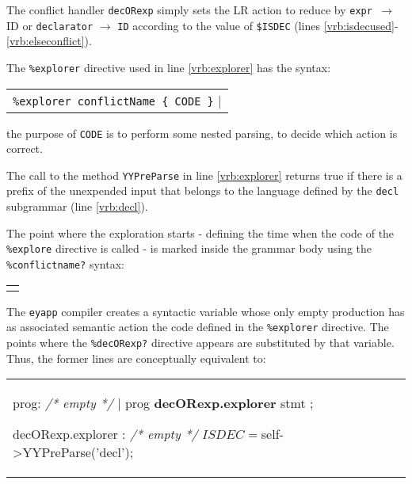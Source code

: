 The conflict handler \verb|decORexp| simply sets the LR action
to reduce by 
\mbox{\tt expr $\rightarrow$} \mbox{ID}
or
\verb|declarator| $\rightarrow$ \verb|ID|
according to the value of \verb|$ISDEC| (lines \ref{vrb:isdecused}-\ref{vrb:elseconflict}).


The \verb|%explorer| directive used in line \ref{vrb:explorer} has the syntax:
\begin{center}
\begin{tabular}{p{147.43pt}}
\verb|%explorer conflictName { CODE }| 
\end{tabular}
\end{center}
the purpose of \verb|CODE| is to perform some nested 
parsing, to decide which action is correct.

The call to the method \verb|YYPreParse| in 
line \ref{vrb:explorer}
returns true if there is a prefix of the unexpended input
that belongs to the language defined by the \verb|decl| subgrammar (line \ref{vrb:decl}).

The point where the exploration starts - defining the time when the code 
of the \verb|%explore| directive is called -
is marked inside
the grammar body using the \verb|%conflictname?| syntax:

\begin{center}
\begin{tabular}{p{5cm}}
\begin{VERBATIM}[firstnumber=26]
prog:
    \textit{/* empty */}
  | prog \textbf{%
;
\end{VERBATIM}
\end{tabular}
\end{center}

The \verb|eyapp| compiler 
creates a syntactic variable  
whose only empty production has as associated semantic action
the code defined in the \verb|%explorer| directive. The points where the 
\verb|%decORexp?| directive appears are substituted by that variable. 
Thus, the former lines are conceptually equivalent to:

\begin{center}
\begin{tabular}{p{8cm}}
\begin{VERBATIM}[numbers=none]
prog:
    \textit{/* empty */}
  | prog \textbf{decORexp.explorer} stmt
;

decORexp.explorer : \textit{/* empty */}
       { $ISDEC = $self->YYPreParse('decl'); }
\end{VERBATIM}
\end{tabular}
\end{center}

